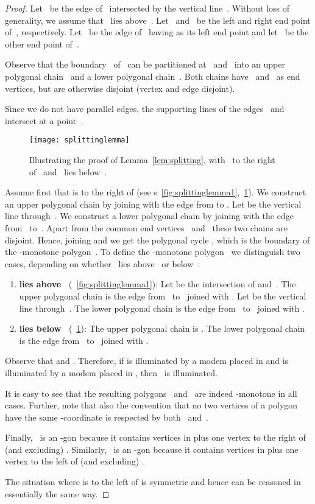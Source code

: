 \documentclass[A4]{article}
\newcommand{\figurenames}{\figurename{s}}
\begin{document}
\begin{proof}
Let~ be the edge of~ intersected by the vertical line~.
Without loss of generality, we assume that~ lies above~.
Let~ and~ be the left and right end point of~, respectively.
Let~ be the edge of~ having  as its left end point and let~ be the other end point of~.

Observe that the boundary~ of~ can be partitioned at~ and~ into an upper polygonal chain~ and a lower polygonal chain~.
Both chains have~ and~ as end vertices, but are otherwise disjoint (vertex and edge disjoint).

Since we do not have parallel edges, the supporting lines of the edges~ and~ intersect at a point~.


\begin{figure}[htb]
  \centering
  \texttt{[image: splittinglemma]}
  \caption{Illustrating the proof of Lemma~\ref{lem:splitting}, with~ to the right of~ and~ lies below~.}
  \label{fig:splittinglemma2}
\end{figure}


Assume first that  is to the right of  (see \figurenames~\ref{fig:splittinglemma1},~\ref{fig:splittinglemma2}).
We construct an upper polygonal chain  by joining  with the edge from  to .
Let  be the vertical line through~.
We construct a lower polygonal chain  by joining  with the edge from~ to~.
Apart from the common end vertices~ and~ these two chains are disjoint.
Hence, joining  and  we get the polygonal cycle , which is the boundary of the -monotone polygon~.
To define the -monotone polygon~ we distinguish two cases, depending on whether~ lies above~ or below~:
\begin{enumerate}
\item \textbf{ lies above~} (\figurename~\ref{fig:splittinglemma1}):
    Let  be the intersection of  and~.
    The upper polygonal chain  is the edge from~ to~ joined with .
    Let  be the vertical line through~.
    The lower polygonal chain  is the edge from~ to~ joined with .
\item \textbf{ lies below~} (\figurename~\ref{fig:splittinglemma2}):
    The upper polygonal chain  is .
    The lower polygonal chain  is the edge from~ to~ joined with .
\end{enumerate}

Observe that  and .
Therefore, if  is illuminated by a modem placed in  and  is illuminated by a modem placed in , then~ is illuminated.








It is easy to see that the resulting polygons~ and~ are indeed -monotone in all cases.
Further, note that also the convention that no two vertices of a polygon have the same -coordinate is respected by both~ and~.

Finally,~ is an -gon because it contains  vertices in  plus one vertex to the right of (and excluding) .
Similarly,~ is an -gon because it contains  vertices in  plus one vertex to the left of (and excluding) .

The situation where  is to the left of  is symmetric and hence can be reasoned in essentially the same way.
\end{proof}
\end{document}
